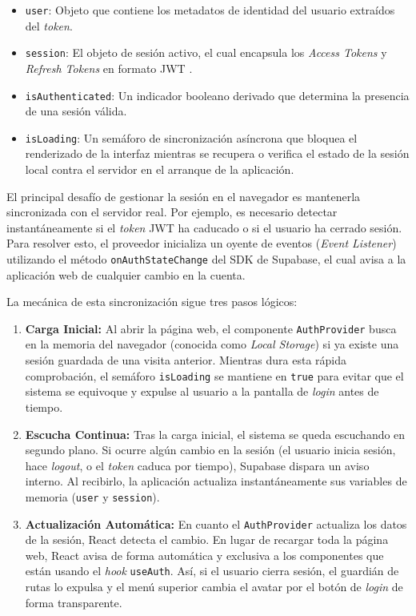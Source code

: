 \documentclass[11pt, a4paper]{report}
\theoremstyle{definition}
\begin{document}
\begin{itemize}
    \item \texttt{user}: Objeto que contiene los metadatos de identidad del usuario extraídos del \textit{token}.
    \item \texttt{session}: El objeto de sesión activo, el cual encapsula los \textit{Access Tokens} y \textit{Refresh Tokens} en formato JWT \cite{rfc7519}.
    \item \texttt{isAuthenticated}: Un indicador booleano derivado que determina la presencia de una sesión válida.
    \item \texttt{isLoading}: Un semáforo de sincronización asíncrona que bloquea el renderizado de la interfaz mientras se recupera o verifica el estado de la sesión local contra el servidor en el arranque de la aplicación.
\end{itemize}

El principal desafío de gestionar la sesión en el navegador es mantenerla sincronizada con el servidor real. Por ejemplo, es necesario detectar instantáneamente si el \textit{token} JWT ha caducado o si el usuario ha cerrado sesión. Para resolver esto, el proveedor inicializa un oyente de eventos (\textit{Event Listener}) utilizando el método \texttt{onAuthStateChange} del SDK de Supabase, el cual avisa a la aplicación web de cualquier cambio en la cuenta.

La mecánica de esta sincronización sigue tres pasos lógicos:

\begin{enumerate}
    \item \textbf{Carga Inicial:} Al abrir la página web, el componente \texttt{AuthProvider} busca en la memoria del navegador (conocida como \textit{Local Storage}) si ya existe una sesión guardada de una visita anterior. Mientras dura esta rápida comprobación, el semáforo \texttt{isLoading} se mantiene en \texttt{true} para evitar que el sistema se equivoque y expulse al usuario a la pantalla de \textit{login} antes de tiempo.
    
    \item \textbf{Escucha Continua:} Tras la carga inicial, el sistema se queda escuchando en segundo plano. Si ocurre algún cambio en la sesión (el usuario inicia sesión, hace \textit{logout}, o el \textit{token} caduca por tiempo), Supabase dispara un aviso interno. Al recibirlo, la aplicación actualiza instantáneamente sus variables de memoria (\texttt{user} y \texttt{session}).
    
    \item \textbf{Actualización Automática:} En cuanto el \texttt{AuthProvider} actualiza los datos de la sesión, React detecta el cambio. En lugar de recargar toda la página web, React avisa de forma automática y exclusiva a los componentes que están usando el \textit{hook} \texttt{useAuth}. Así, si el usuario cierra sesión, el guardián de rutas lo expulsa y el menú superior cambia el avatar por el botón de \textit{login} de forma transparente.
\end{enumerate}
\end{document}
